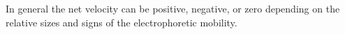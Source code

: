 			In general the net velocity can be positive, negative, or zero depending on the relative sizes and signs of the electrophoretic mobility.



			

			
			
			

			
			
			
			

			
			


			
	






